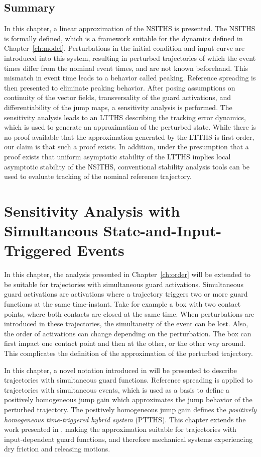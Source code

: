 \documentclass[../DC2017114Bouma.tex]{subfiles}
\begin{document}
\section{Summary}
In this chapter, a linear approximation of the NSITHS is presented. The NSITHS is formally defined, which is a framework suitable for the dynamics defined in Chapter~\ref{ch:model}. Perturbations in the initial condition and input curve are introduced into this system, resulting in perturbed trajectories of which the event times differ from the nominal event times, and are not known beforehand. This mismatch in event time leads to a behavior called peaking. Reference spreading is then presented to eliminate peaking behavior. After posing assumptions on continuity of the vector fields, transversality of the guard activations, and differentiability of the jump maps, a sensitivity analysis is performed. The sensitivity analysis leads to an LTTHS describing the tracking error dynamics, which is used to generate an approximation of the perturbed state. While there is no proof available that the approximation generated by the LTTHS is first order, our claim is that such a proof exists. In addition, under the presumption that a proof exists that uniform asymptotic stability of the LTTHS implies local asymptotic stability of the NSITHS, conventional stability analysis tools can be used to evaluate tracking of the nominal reference trajectory.


\cleartooddpage
\chapter{Sensitivity Analysis with Simultaneous State-and-Input-Triggered Events}\label{ch:simult}
In this chapter, the analysis presented in Chapter~\ref{ch:order} will be extended to be suitable for trajectories with simultaneous guard activations. Simultaneous guard activations are activations where a trajectory triggers two or more guard functions at the same time-instant. Take for example a box with two contact points, where both contacts are closed at the same time. When perturbations are introduced in these trajectories, the simultaneity of the event can be lost. Also, the order of activations can change depending on the perturbation. The box can first impact one contact point and then at the other, or the other way around. This complicates the definition of the approximation of the perturbed trajectory. 

In this chapter, a novel notation introduced in \cite{Rijnen2018} will be presented to describe trajectories with simultaneous guard functions. Reference spreading is applied to trajectories with simultaneous events, which is used as a basis to define a positively homogeneous jump gain which approximates the jump behavior of the perturbed trajectory. The positively homogeneous jump gain defines the \textit{positively homogeneous time-triggered hybrid system} (PTTHS). This chapter extends the work presented in \cite{Rijnen2018,Rijnen2018a}, making the approximation suitable for trajectories with input-dependent guard functions, and therefore mechanical systems experiencing dry friction and releasing motions.
\end{document}
